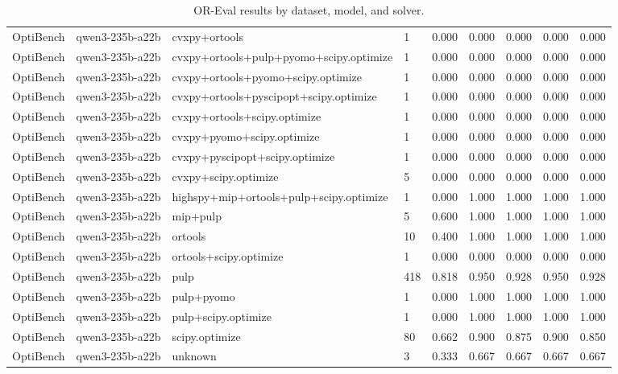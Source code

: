 \begin{table}[t]
\begin{tabular}{lllllllll}
OptiBench & qwen3-235b-a22b & cvxpy+ortools & 1 & 0.000 & 0.000 & 0.000 & 0.000 & 0.000 \\
OptiBench & qwen3-235b-a22b & cvxpy+ortools+pulp+pyomo+scipy.optimize & 1 & 0.000 & 0.000 & 0.000 & 0.000 & 0.000 \\
OptiBench & qwen3-235b-a22b & cvxpy+ortools+pyomo+scipy.optimize & 1 & 0.000 & 0.000 & 0.000 & 0.000 & 0.000 \\
OptiBench & qwen3-235b-a22b & cvxpy+ortools+pyscipopt+scipy.optimize & 1 & 0.000 & 0.000 & 0.000 & 0.000 & 0.000 \\
OptiBench & qwen3-235b-a22b & cvxpy+ortools+scipy.optimize & 1 & 0.000 & 0.000 & 0.000 & 0.000 & 0.000 \\
OptiBench & qwen3-235b-a22b & cvxpy+pyomo+scipy.optimize & 1 & 0.000 & 0.000 & 0.000 & 0.000 & 0.000 \\
OptiBench & qwen3-235b-a22b & cvxpy+pyscipopt+scipy.optimize & 1 & 0.000 & 0.000 & 0.000 & 0.000 & 0.000 \\
OptiBench & qwen3-235b-a22b & cvxpy+scipy.optimize & 5 & 0.000 & 0.000 & 0.000 & 0.000 & 0.000 \\
OptiBench & qwen3-235b-a22b & highspy+mip+ortools+pulp+scipy.optimize & 1 & 0.000 & 1.000 & 1.000 & 1.000 & 1.000 \\
OptiBench & qwen3-235b-a22b & mip+pulp & 5 & 0.600 & 1.000 & 1.000 & 1.000 & 1.000 \\
OptiBench & qwen3-235b-a22b & ortools & 10 & 0.400 & 1.000 & 1.000 & 1.000 & 1.000 \\
OptiBench & qwen3-235b-a22b & ortools+scipy.optimize & 1 & 0.000 & 0.000 & 0.000 & 0.000 & 0.000 \\
OptiBench & qwen3-235b-a22b & pulp & 418 & 0.818 & 0.950 & 0.928 & 0.950 & 0.928 \\
OptiBench & qwen3-235b-a22b & pulp+pyomo & 1 & 0.000 & 1.000 & 1.000 & 1.000 & 1.000 \\
OptiBench & qwen3-235b-a22b & pulp+scipy.optimize & 1 & 0.000 & 1.000 & 1.000 & 1.000 & 1.000 \\
OptiBench & qwen3-235b-a22b & scipy.optimize & 80 & 0.662 & 0.900 & 0.875 & 0.900 & 0.850 \\
OptiBench & qwen3-235b-a22b & unknown & 3 & 0.333 & 0.667 & 0.667 & 0.667 & 0.667 \\
\bottomrule
\end{tabular}
\caption{OR-Eval results by dataset, model, and solver.}
\label{tab:or_eval_solver}
\end{table}

